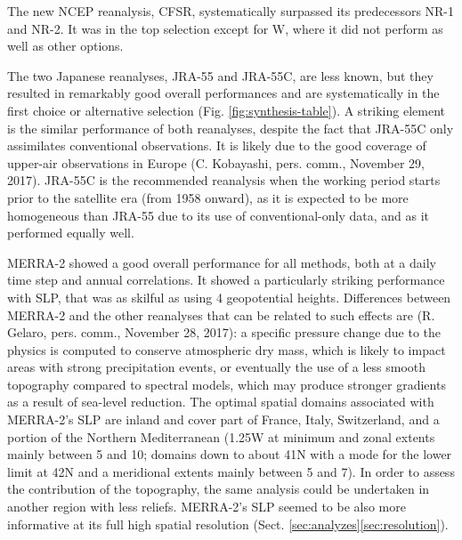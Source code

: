 \documentclass{ametsoc}
\begin{document}
The new NCEP reanalysis, CFSR, systematically surpassed its predecessors NR-1 and NR-2. It was in the top selection except for W, where it did not perform as well as other options.

The two Japanese reanalyses, JRA-55 and JRA-55C, are less known, but they resulted in remarkably good overall performances and are systematically in the first choice or alternative selection (Fig. \ref{fig:synthesis-table}). A striking element is the similar performance of both reanalyses, despite the fact that JRA-55C only assimilates conventional observations. It is likely due to the good coverage of upper-air observations in Europe (C. Kobayashi, pers. comm., November 29, 2017). JRA-55C is the recommended reanalysis when the working period starts prior to the satellite era (from 1958 onward), as it is expected to be more homogeneous than JRA-55 due to its use of conventional-only data, and as it performed equally well.

MERRA-2 showed a good overall performance for all methods, both at a daily time step and annual correlations. It showed a particularly striking performance with SLP, that was as skilful as using 4 geopotential heights. Differences between MERRA-2 and the other reanalyses that can be related to such effects are (R. Gelaro, pers. comm., November 28, 2017): a specific pressure change due to the physics is computed to conserve atmospheric dry mass, which is likely to impact areas with strong precipitation events, or eventually the use of a less smooth topography compared to spectral models, which may produce stronger gradients as a result of sea-level reduction. The optimal spatial domains associated with MERRA-2's SLP are inland and cover part of France, Italy, Switzerland, and a portion of the Northern Mediterranean (1.25\degree W at minimum and zonal extents mainly between 5 and 10\degree; domains down to about 41\degree N with a mode for the lower limit at 42\degree N and a meridional extents mainly between 5 and 7\degree). In order to assess the contribution of the topography, the same analysis could be undertaken in another region with less reliefs. MERRA-2's SLP seemed to be also more informative at its full high spatial resolution (Sect. \ref{sec:analyzes}\ref{sec:resolution}).
\end{document}
